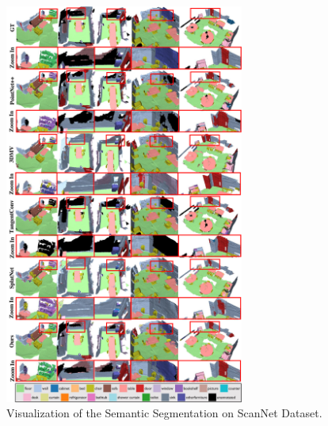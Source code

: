 \begin{figure}
\centering
\includegraphics[width=0.7\textwidth]{texturenet/supplemental/supple_scannet2.pdf}
\caption{Visualization of the Semantic Segmentation on ScanNet Dataset.}
\label{fig:texturenet-supple-scannet2}
\end{figure}

